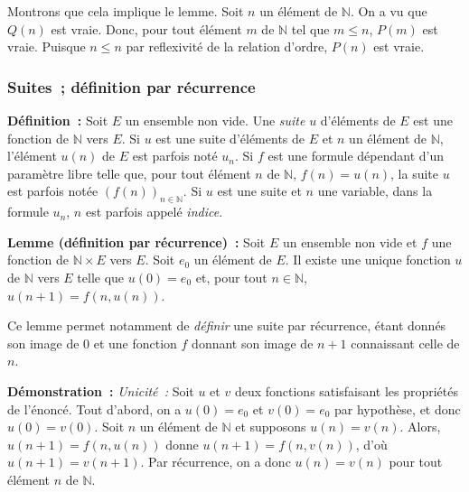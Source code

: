     Montrons que cela implique le lemme. 
    Soit $n$ un élément de $\mathbb{N}$. 
    On a vu que $Q(n)$ est vraie. 
    Donc, pour tout élément $m$ de $\mathbb{N}$ tel que $m \leq n$, $P(m)$ est vraie. 
    Puisque $n \leq n$ par reflexivité de la relation d'ordre, $P(n)$ est vraie.

   \done 

\subsubsection{Suites ; définition par récurrence}
\label{subsub:suites}

\noindent\textbf{Définition :} Soit $E$ un ensemble non vide. 
    Une \textit{suite} $u$ d'éléments de $E$ est une fonction de $\mathbb{N}$ vers $E$. 
    Si $u$ est une suite d'éléments de $E$ et $n$ un élément de $\mathbb{N}$, l'élément $u(n)$ de $E$ est parfois noté $u_n$. 
    Si $f$ est une formule dépendant d'un paramètre libre telle que, pour tout élément $n$ de $\mathbb{N}$, $f(n) = u(n)$, la suite $u$ est parfois notée $\left( f(n) \right)_{n \in \mathbb{N}}$.
    Si $u$ est une suite et $n$ une variable, dans la formule $u_n$, $n$ est parfois appelé \textit{indice}.
     

\medskip

\noindent\textbf{Lemme (définition par récurrence) :} Soit $E$ un ensemble non vide et $f$ une fonction de $\mathbb{N} \times E$ vers $E$.
    Soit $e_0$ un élément de $E$. 
    Il existe une unique fonction $u$ de $\mathbb{N}$ vers $E$ telle que $u(0) = e_0$ et, pour tout $n \in \mathbb{N}$, $u(n+1) = f(n, u(n))$.

\medskip

\noindent Ce lemme permet notamment de \textit{définir} une suite par récurrence, étant donnés son image de $0$ et une fonction $f$ donnant son image de $n+1$ connaissant celle de $n$.

\medskip

\noindent\textbf{Démonstration :}
\textit{Unicité :} Soit $u$ et $v$ deux fonctions satisfaisant les propriétés de l'énoncé. 
       Tout d'abord, on a $u(0) = e_0$ et $v(0) = e_0$ par hypothèse, et donc $u(0) = v(0)$.
       Soit $n$ un élément de $\mathbb{N}$ et supposons $u(n) = v(n)$. Alors, $u(n+1) = f(n, u(n))$ donne $u(n+1) = f(n, v(n))$, d'où $u(n+1) = v(n+1)$. 
       Par récurrence, on a donc $u(n) = v(n)$ pour tout élément $n$ de $\mathbb{N}$.

